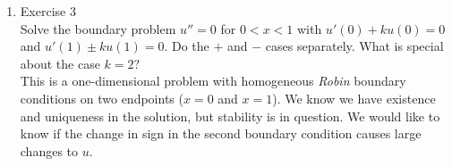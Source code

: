 \documentclass[12pt]{article}%
\begin{document}
\begin{enumerate}
\begin{enumerate}
        \pagebreak
        
        \item Exercise 3 \smallskip \\
        Solve the boundary problem $u'' = 0$ for $0 < x < 1$ with $u'\left(0\right) + ku\left(0\right) = 0$ and $u'\left(1\right) \pm ku\left(1\right) = 0$.  Do the $+$ and $-$ cases separately.  What is special about the case $k=2$? \\

        This is a one-dimensional problem with homogeneous \emph{Robin} boundary conditions on two endpoints ($x = 0$ and $x = 1$). We know we have existence and uniqueness in the solution, but stability is in question. We would like to know if the change in sign in the second boundary condition causes large changes to $u$. 


\end{enumerate}
\end{enumerate}
\end{document}

